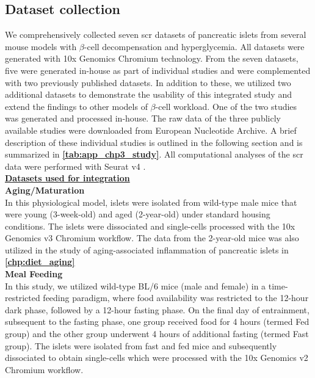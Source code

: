 \subsection[Dataset collection]{Dataset collection}
\label{subsubsec:met_chp3_data}

We comprehensively collected seven \gls{scr} datasets of pancreatic islets from several mouse models with $\beta$-cell decompensation and hyperglycemia. All datasets were generated with 10x Genomics Chromium technology. From the seven datasets, five were generated in-house as part of individual studies and were complemented with two previously published datasets. In addition to these, we utilized two additional datasets to demonstrate the usability of this integrated study and extend the findings to other models of $\beta$-cell workload. One of the two studies was generated and processed in-house. The raw data of the three publicly available studies were downloaded from European Nucleotide Archive. A brief description of these individual studies is outlined in the following section and is summarized in \textbf{\autoref{tab:app_chp3_study}}. All computational analyses of the \gls{scr} data were performed with Seurat v4 \textbf{\cite{hao_integrated_2021}}.\\


\underline{\normalsize \textbf{Datasets used for integration}}\\


\textbf{Aging/Maturation\\}
In this physiological model, islets were isolated from wild-type male mice that were young (3-week-old) and aged (2-year-old) under standard housing conditions. The islets were dissociated and single-cells processed with the 10x Genomics v3 Chromium workflow. The data from the 2-year-old mice was also utilized in the study of aging-associated inflammation of pancreatic islets in \textbf{\autoref{chp:diet_aging}}\\

\textbf{Meal Feeding\\}
In this study, we utilized wild-type BL/6 mice (male and female) in a time-restricted feeding paradigm, where food availability was restricted to the 12-hour dark phase, followed by a 12-hour fasting phase. On the final day of entrainment, subsequent to the fasting phase, one group received food for 4 hours (termed Fed group) and the other group underwent 4 hours of additional fasting (termed Fast group). The islets were isolated from fast and fed mice and subsequently dissociated to obtain single-cells which were processed with the 10x Genomics v2 Chromium workflow.\\

